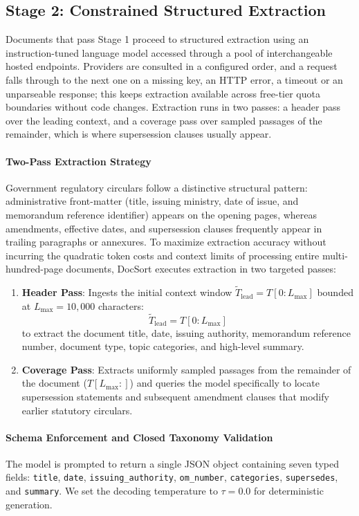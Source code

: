 \documentclass{article}
\begin{document}
\subsection{Stage 2: Constrained Structured Extraction}
Documents that pass Stage 1 proceed to structured extraction using an instruction-tuned language model accessed through a pool of interchangeable hosted endpoints. Providers are consulted in a configured order, and a request falls through to the next one on a missing key, an HTTP error, a timeout or an unparseable response; this keeps extraction available across free-tier quota boundaries without code changes. Extraction runs in two passes: a header pass over the leading context, and a coverage pass over sampled passages of the remainder, which is where supersession clauses usually appear.

\paragraph{Two-Pass Extraction Strategy}
Government regulatory circulars follow a distinctive structural pattern: administrative front-matter (title, issuing ministry, date of issue, and memorandum reference identifier) appears on the opening pages, whereas amendments, effective dates, and supersession clauses frequently appear in trailing paragraphs or annexures. To maximize extraction accuracy without incurring the quadratic token costs and context limits of processing entire multi-hundred-page documents, DocSort executes extraction in two targeted passes:
\begin{enumerate}
    \item \textbf{Header Pass}: Ingests the initial context window $\tilde{T}_{\text{lead}} = T[0 : L_{\max}]$ bounded at $L_{\max} = 10{,}000$ characters:
\begin{equation}
    \tilde{T}_{\text{lead}} = T[0 : L_{\max}]
\end{equation}
to extract the document title, date, issuing authority, memorandum reference number, document type, topic categories, and high-level summary.
    \item \textbf{Coverage Pass}: Extracts uniformly sampled passages from the remainder of the document ($T[L_{\max} :]$) and queries the model specifically to locate supersession statements and subsequent amendment clauses that modify earlier statutory circulars.
\end{enumerate}

\paragraph{Schema Enforcement and Closed Taxonomy Validation}
The model is prompted to return a single JSON object containing seven typed fields: \texttt{title}, \texttt{date}, \texttt{issuing\_authority}, \texttt{om\_number}, \texttt{categories}, \texttt{supersedes}, and \texttt{summary}. We set the decoding temperature to $\tau = 0.0$ for deterministic generation.
\end{document}
